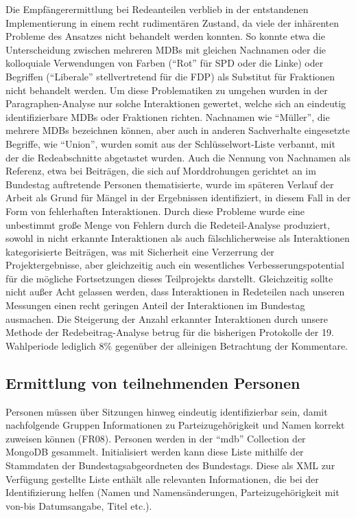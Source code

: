 Die Empfängerermittlung bei Redeanteilen verblieb in der entstandenen
Implementierung in einem recht rudimentären Zustand, da viele der inhärenten
Probleme des Ansatzes nicht behandelt werden konnten. So konnte etwa die
Unterscheidung zwischen mehreren MDBs mit gleichen Nachnamen oder die
kolloquiale Verwendungen von Farben (\enquote{Rot} für SPD oder die Linke) oder
Begriffen (\enquote{Liberale} stellvertretend für die FDP) als Substitut für Fraktionen
nicht behandelt werden. Um diese Problematiken zu umgehen wurden in der
Paragraphen-Analyse nur solche Interaktionen gewertet, welche sich an eindeutig
identifizierbare MDBs oder Fraktionen richten. Nachnamen wie \enquote{Müller}, die
mehrere MDBs bezeichnen können, aber auch in anderen Sachverhalte eingesetzte
Begriffe, wie \enquote{Union}, wurden somit aus der Schlüsselwort-Liste verbannt, mit
der die Redeabschnitte abgetastet wurden. Auch die Nennung von Nachnamen als
Referenz, etwa bei Beiträgen, die sich auf Morddrohungen gerichtet an im
Bundestag auftretende Personen thematisierte, wurde im späteren Verlauf der
Arbeit als Grund für Mängel in der Ergebnissen  identifiziert, in diesem Fall in
der Form von fehlerhaften Interaktionen. Durch diese Probleme wurde eine
unbestimmt große Menge von Fehlern durch die Redeteil-Analyse produziert,
sowohl in nicht erkannte Interaktionen als auch fälschlicherweise als
Interaktionen kategorisierte Beiträgen, was mit Sicherheit eine Verzerrung der
Projektergebnisse, aber gleichzeitig auch ein wesentliches
Verbesserungspotential für die mögliche Fortsetzungen dieses Teilprojekts
darstellt. Gleichzeitig sollte nicht außer Acht gelassen werden, dass
Interaktionen in Redeteilen nach unseren Messungen einen recht geringen Anteil
der Interaktionen im Bundestag ausmachen. Die Steigerung der Anzahl erkannter
Interaktionen durch unsere Methode der Redebeitrag-Analyse betrug für die
bisherigen Protokolle der 19. Wahlperiode lediglich 8\% gegenüber der alleinigen
Betrachtung der Kommentare.

\subsection{Ermittlung von teilnehmenden Personen}
Personen müssen über Sitzungen hinweg eindeutig identifizierbar sein, damit
nachfolgende Gruppen Informationen zu Parteizugehörigkeit und Namen korrekt
zuweisen können (FR08). Personen werden in der \enquote{mdb} Collection der MongoDB
gesammelt. Initialisiert werden kann diese Liste mithilfe der Stammdaten der
Bundestagsabgeordneten des Bundestags. Diese als XML zur Verfügung gestellte
Liste enthält alle relevanten Informationen, die bei der Identifizierung
helfen (Namen und Namensänderungen, Parteizugehörigkeit mit von-bis
Datumsangabe, Titel etc.).

